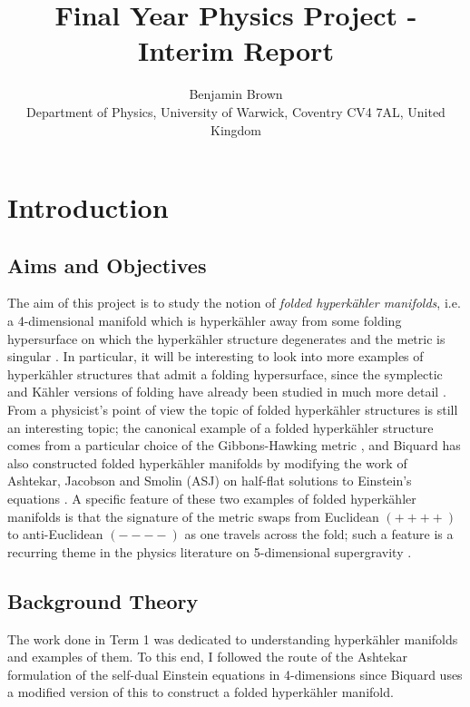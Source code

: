 \documentclass[a4paper,onecolumn,12pt]{article}
\theoremstyle{definition}
\theoremstyle{remark}
\newcommand{\K}{K\"ahler }
\newcommand{\HK}{hyperk\"ahler }
\begin{document}
\title{Final Year Physics Project - Interim Report}

\author{Benjamin Brown \\
        \small
        Department of Physics, University of Warwick,
        Coventry CV4 7AL, United Kingdom}
\date{}


\maketitle

\section{Introduction}

\subsection{Aims and Objectives}

The aim of this project is to study the notion of \emph{folded hyperk{\"a}hler manifolds}, i.e. a 4-dimensional manifold which is hyperk{\"a}hler away from some folding hypersurface on which the hyperk{\"a}hler structure degenerates and the metric is singular \cite{hitchin_2015,biquard_2015}. In particular, it will be interesting to look into more examples of \HK structures that admit a folding hypersurface, since the symplectic and \K versions of folding have already been studied in much more detail \cite{dasilva_2000,baykur_2006}.\\

From a physicist's point of view the topic of folded \HK structures is still an interesting topic; the canonical example of a folded \HK structure comes from a particular choice of the Gibbons-Hawking metric \cite{hitchin_2015}, and Biquard \cite{biquard_2015} has also constructed folded \HK manifolds by modifying the work of Ashtekar, Jacobson and Smolin (ASJ) on half-flat solutions to Einstein's equations \cite{ashtekar_1988}. A specific feature of these two examples of folded \HK manifolds is that the signature of the metric swaps from Euclidean $(++++)$ to anti-Euclidean $(----)$ as one travels across the fold; such a feature is a recurring theme in the physics literature on 5-dimensional supergravity \cite{gibbons_2013}.

\newpage
\subsection{Background Theory}
The work done in Term 1 was dedicated to understanding \HK manifolds and examples of them. To this end, I followed the route of the Ashtekar formulation \cite{ashtekar_1987} of the self-dual Einstein equations in 4-dimensions since Biquard \cite{biquard_2015} uses a modified version of this to construct a folded \HK manifold.
\end{document}
